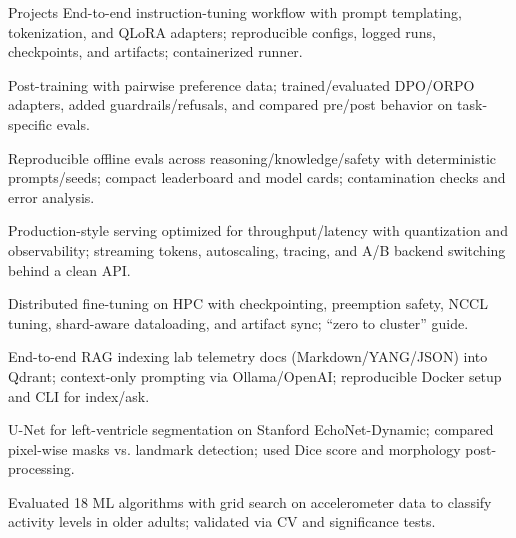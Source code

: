 \begin{rubricnorepeat}{Projects}
\noentry{~}
End-to-end instruction-tuning workflow with prompt templating, tokenization, and QLoRA adapters; reproducible configs, logged runs, checkpoints, and artifacts; containerized runner.\hfill \href{https://github.com/musel25/instruction-tuning}{\faGithub}

Post-training with pairwise preference data; trained/evaluated DPO/ORPO adapters, added guardrails/refusals, and compared pre/post behavior on task-specific evals.\hfill \href{https://github.com/musel25/preference-optimization}{\faGithub}

Reproducible offline evals across reasoning/knowledge/safety with deterministic prompts/seeds; compact leaderboard and model cards; contamination checks and error analysis.\hfill \href{https://github.com/musel25/evaluation-harness}{\faGithub}

Production-style serving optimized for throughput/latency with quantization and observability; streaming tokens, autoscaling, tracing, and A/B backend switching behind a clean API.\hfill \href{https://github.com/musel25/high-performance-serving}{\faGithub}

Distributed fine-tuning on HPC with checkpointing, preemption safety, NCCL tuning, shard-aware dataloading, and artifact sync; “zero to cluster” guide.\hfill \href{https://github.com/musel25/slurm-fine-tuning}{\faGithub}

End-to-end RAG indexing lab telemetry docs (Markdown/YANG/JSON) into Qdrant; context-only prompting via Ollama/OpenAI; reproducible Docker setup and CLI for index/ask.\hfill 
\href{https://github.com/musel25/telemetry-rag}{\faGithub}

U-Net for left-ventricle segmentation on Stanford EchoNet-Dynamic; compared pixel-wise masks vs. landmark detection; used Dice score and morphology post-processing.\hfill\href{https://github.com/Tec-AI-23/EchoNetDynamic}{\faGithub}

Evaluated 18 ML algorithms with grid search on accelerometer data to classify activity levels in older adults; validated via CV and significance tests.\hfill \href{https://github.com/Tec-AI-23/HAR70}{\faGithub}


\end{rubricnorepeat}
